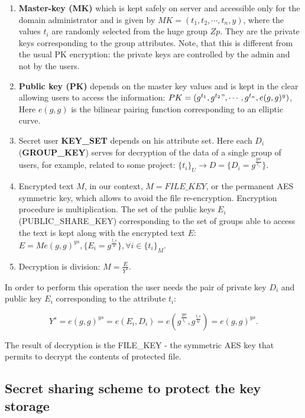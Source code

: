 \documentclass[twocolumn]{svjour3}          	%
\begin{document}
\begin{enumerate}
	\item \textbf{Master-key (MK)} which is kept safely on server and accessible only for the domain administrator and is given by $MK = (t_1, t_2, \cdots ,t_n, y)$, where the values $t_i$ are randomly selected from the huge group $Zp$. They are the private keys corresponding to the group attributes. Note, that this is different from the usual PK encryption: the private keys are controlled by the admin and not by the users.
	\item \textbf{Public key (PK)} depends on the master key values and is kept in the clear allowing users to access the information: $PK = (g^{t_1}, g^{t_2}", \cdots ,g^{t_n}, e(g,g)^y)$, Here $e(g,g)$ is the bilinear pairing function corresponding to an elliptic curve.
	\item Secret user \textbf{KEY\_SET} depends on his attribute set. Here each $D_i$ (\textbf{GROUP\_KEY}) serves for decryption of the data of a single group of users, for example, related to some project: 	$\{t_i\}_U \rightarrow D = \{D_i = g^{\frac{yw}{t_i}}\}$.
	\item Encrypted text $M$, in our context, $M = FILE\_KEY$, or the permanent AES symmetric key, which allows to avoid the file re-encryption. Encryption procedure is multiplication. The set of the public keys $E_i$ (PUBLIC\_SHARE\_KEY) corresponding to the set of groups able to access the text is kept along with the encrypted text $E$: $E=Me(g,g)^{ys}, \{E_i = g^{\frac{t_is}{w}}\}, \forall i \in \{t_i\}_M$.
	\item Decryption is division: $M = \frac{E}{Y^s}$. 
\end{enumerate}

In order to perform this operation the user needs the pair of private key $D_i$ and public key $E_i$ corresponding to the attribute $t_i$: 

\begin{equation}\label{eq:eq00}
Y^s = e(g,g)^{ys} = e(E_i,D_i) = e(g^{\frac{yw}{t_i}},g^{\frac{t_is}{w}})=e(g,g)^{ys}.
\end{equation}

The result of decryption is the FILE\_KEY - the symmetric AES key that permits to decrypt the contents of protected file. 

\subsection{Secret sharing scheme to protect the key storage }
\label{sec_secret}
\end{document}
